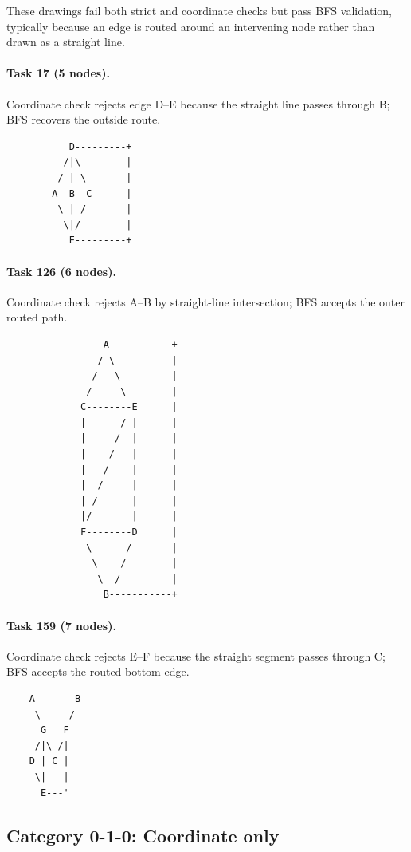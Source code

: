 \documentclass{article}
\begin{document}
These drawings fail both strict and coordinate checks but pass BFS validation, typically because an edge is routed around an intervening node rather than drawn as a straight line.

\paragraph{Task 17 (5 nodes).} Coordinate check rejects edge D--E because the straight line passes through B; BFS recovers the outside route.

\begin{verbatim}
           D---------+
          /|\        |
         / | \       |
        A  B  C      |
         \ | /       |
          \|/        |
           E---------+
\end{verbatim}

\paragraph{Task 126 (6 nodes).} Coordinate check rejects A--B by straight-line intersection; BFS accepts the outer routed path.

\begin{verbatim}
                 A-----------+
                / \          |
               /   \         |
              /     \        |
             C--------E      |
             |      / |      |
             |     /  |      |
             |    /   |      |
             |   /    |      |
             |  /     |      |
             | /      |      |
             |/       |      |
             F--------D      |
              \      /       |
               \    /        |
                \  /         |
                 B-----------+
\end{verbatim}

\paragraph{Task 159 (7 nodes).} Coordinate check rejects E--F because the straight segment passes through C; BFS accepts the routed bottom edge.

\begin{verbatim}
    A       B
     \     /
      G   F
     /|\ /|
    D | C |
     \|   |
      E---'
\end{verbatim}
\newpage
\subsection*{Category 0-1-0: Coordinate only}
\end{document}

